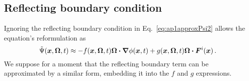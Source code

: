 \subsection{Reflecting boundary condition}
Ignoring the reflecting boundary condition in Eq.~\eqref{eq:ap1approxPsi2}
allows the equation's reformulation as
\begin{equation*}
  \tilde\Psi(\bm{x},\bm{\Omega},t)
  \approx 
 - f(\bm{x},\bm{\Omega},t) \bm{\Omega}\bm{\cdot} \bm{\nabla} \phi(\bm{x},t)
 + g(\bm{x},\bm{\Omega},t) \bm{\Omega}\bm{\cdot} \bm{F}^i(\bm{x})\,.
\end{equation*}
We suppose for a moment that the reflecting boundary term can be approximated
by a similar form, embedding it into the $f$ and $g$ expressions.

